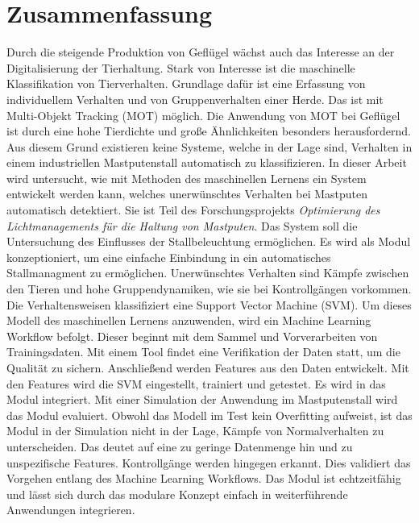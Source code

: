 \section*{Zusammenfassung}
\vspace*{-5mm}
Durch die steigende Produktion von Geflügel wächst auch das Interesse an der Digitalisierung der Tierhaltung. Stark von Interesse ist die maschinelle Klassifikation von Tierverhalten. Grundlage dafür ist eine Erfassung von individuellem Verhalten und von Gruppenverhalten einer Herde. Das ist mit Multi-Objekt Tracking (MOT) möglich. Die Anwendung von MOT bei Geflügel ist durch eine hohe Tierdichte und große Ähnlichkeiten besonders herausfordernd. Aus diesem Grund existieren keine Systeme, welche in der Lage sind, Verhalten in einem industriellen Mastputenstall automatisch zu klassifizieren. In dieser Arbeit wird untersucht, wie mit Methoden des maschinellen Lernens ein System entwickelt werden kann, welches unerwünschtes Verhalten bei Mastputen automatisch detektiert. Sie ist Teil des Forschungsprojekts \textit{Optimierung des Lichtmanagements für die Haltung von Mastputen}. Das System soll die Untersuchung des Einflusses der Stallbeleuchtung ermöglichen. Es wird als Modul konzeptioniert, um eine einfache Einbindung in ein automatisches Stallmanagment zu ermöglichen. Unerwünschtes Verhalten sind Kämpfe zwischen den Tieren und hohe Gruppendynamiken, wie sie bei Kontrollgängen vorkommen. Die Verhaltensweisen klassifiziert eine Support Vector Machine (SVM). Um dieses Modell des maschinellen Lernens anzuwenden, wird ein Machine Learning Workflow befolgt. Dieser beginnt mit dem Sammel und Vorverarbeiten von Trainingsdaten. Mit einem Tool findet eine Verifikation der Daten statt, um die Qualität zu sichern. Anschließend werden Features aus den Daten entwickelt. Mit den Features wird die SVM eingestellt, trainiert und getestet. Es wird in das Modul integriert. Mit einer Simulation der Anwendung im Mastputenstall wird das Modul evaluiert. Obwohl das Modell im Test kein Overfitting aufweist, ist das Modul in der Simulation nicht in der Lage, Kämpfe von Normalverhalten zu unterscheiden. Das deutet auf eine zu geringe Datenmenge hin und zu unspezifische Features. Kontrollgänge werden hingegen erkannt. Dies validiert das Vorgehen entlang des Machine Learning Workflows. Das Modul ist echtzeitfähig und lässt sich durch das modulare Konzept einfach in weiterführende Anwendungen integrieren. 
